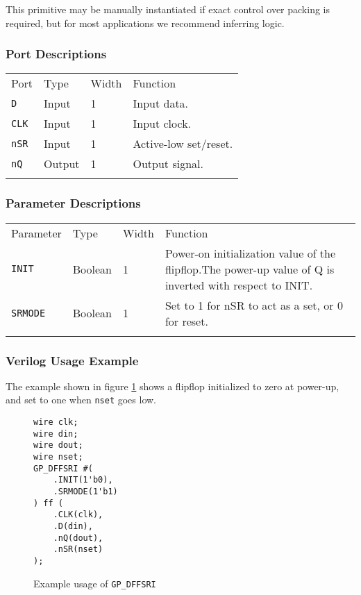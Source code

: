 \documentclass[11pt]{article}
\newcommand{\tokenstyle}[1]{\texttt{#1}}
\newcommand{\wirestyle}[1]{\texttt{#1}}
\newcommand{\whenstyle}[1]{{\fontseries{sb}\selectfont#1}}
\newcommand{\thinhline}{\Xhline{1\arrayrulewidth}}
\newcommand{\thickhline}{\Xhline{2.5\arrayrulewidth}}
\begin{document}
This primitive may be manually instantiated if exact control over packing is required, but for most applications we
recommend inferring logic.

\subsubsection{Port Descriptions}

\begin{tabularx}{\textwidth}{lllX}
\thinhline
\whenstyle{Port} & \whenstyle{Type} & \whenstyle{Width} & \whenstyle{Function} \\
\thickhline
\tokenstyle{D} & Input & 1 & Input data. \\
\thinhline
\tokenstyle{CLK} & Input & 1 & Input clock. \\
\thinhline
\tokenstyle{nSR} & Input & 1 & Active-low set/reset. \\
\thinhline
\tokenstyle{nQ} & Output & 1 & Output signal. \\
\thinhline
\end{tabularx}

\subsubsection{Parameter Descriptions}

\begin{tabularx}{\textwidth}{lllX}
\thinhline
\whenstyle{Parameter} & \whenstyle{Type} & \whenstyle{Width} & \whenstyle{Function} \\
\thickhline
\tokenstyle{INIT} & Boolean & 1 & Power-on initialization value of the flipflop.\newline The power-up value of Q is
inverted with respect to INIT.\\
\thinhline
\tokenstyle{SRMODE} & Boolean & 1 & Set to 1 for nSR to act as a set, or 0 for reset. \\
\thinhline
\end{tabularx}

\subsubsection{Verilog Usage Example}

The example shown in figure \ref{gp-dffsri-example} shows a flipflop initialized to zero at power-up, and set to one
when \wirestyle{nset} goes low.

\begin{figure}[h]
\begin{lstlisting}
wire clk;
wire din;
wire dout;
wire nset;
GP_DFFSRI #(
	.INIT(1'b0),
	.SRMODE(1'b1)
) ff (
	.CLK(clk),
	.D(din),
	.nQ(dout),
	.nSR(nset)
);
\end{lstlisting}
\caption{Example usage of \tokenstyle{GP\_DFFSRI}}
\label{gp-dffsri-example}
\end{figure}
\end{document}
